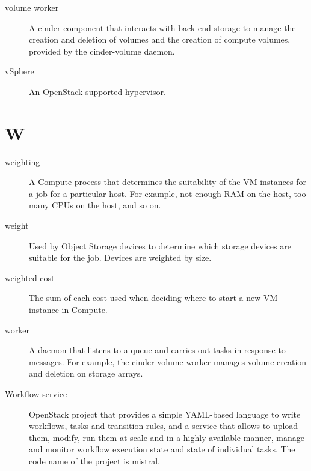 \documentclass[letterpaper,10pt,english]{sphinxmanual}
\begin{document}
\begin{description}
\item[{volume worker}] \leavevmode{}\label{_source/glossary:term-volume-worker}
A cinder component that interacts with back-end storage to manage
the creation and deletion of volumes and the creation of compute
volumes, provided by the cinder-volume daemon.

\item[{vSphere}] \leavevmode{}\label{_source/glossary:term-vsphere}
An OpenStack-supported hypervisor.

\end{description}


\section{W}
\label{_source/glossary:w}\begin{description}
\item[{weighting}] \leavevmode{}\label{_source/glossary:term-weighting}
A Compute process that determines the suitability of the VM
instances for a job for a particular host. For example, not enough RAM
on the host, too many CPUs on the host, and so on.

\item[{weight}] \leavevmode{}\label{_source/glossary:term-weight}
Used by Object Storage devices to determine which storage
devices are suitable for the job. Devices are weighted by size.

\item[{weighted cost}] \leavevmode{}\label{_source/glossary:term-weighted-cost}
The sum of each cost used when deciding where to start a new VM
instance in Compute.

\item[{worker}] \leavevmode{}\label{_source/glossary:term-worker}
A daemon that listens to a queue and carries out tasks in
response to messages. For example, the cinder-volume worker manages volume
creation and deletion on storage arrays.

\item[{Workflow service}] \leavevmode{}\label{_source/glossary:term-workflow-service}
OpenStack project that provides a simple YAML-based language
to write workflows, tasks and transition rules, and a
service that allows to upload them, modify, run them at
scale and in a highly available manner, manage and monitor
workflow execution state and state of individual tasks. The
code name of the project is mistral.

\end{description}
\end{document}
